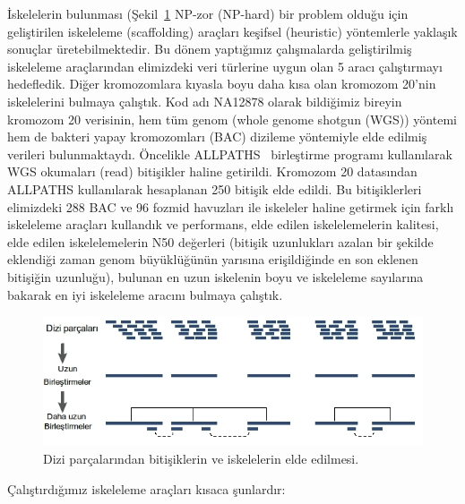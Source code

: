 \documentclass[11pt]{article}
\begin{document}
İskelelerin bulunması (Şekil~\ref{fig:scaffold} NP-zor (NP-hard) bir problem olduğu için geliştirilen iskeleleme (scaffolding) araçları keşifsel (heuristic) yöntemlerle yaklaşık sonuçlar üretebilmektedir. Bu dönem yaptığımız çalışmalarda geliştirilmiş iskeleleme araçlarından elimizdeki veri türlerine uygun olan 5 aracı çalıştırmayı hedefledik. Diğer kromozomlara kıyasla boyu daha kısa olan kromozom 20'nin iskelelerini bulmaya çalıştık. Kod adı NA12878 olarak bildiğimiz bireyin kromozom 20 verisinin, hem tüm genom (whole genome shotgun (WGS)) yöntemi hem de bakteri yapay kromozomları (BAC) dizileme yöntemiyle elde edilmiş verileri bulunmaktaydı. Öncelikle ALLPATHS~\cite{Gnerre2011} birleştirme programı kullanılarak WGS okumaları (read) bitişikler haline getirildi. Kromozom 20 datasından ALLPATHS kullanılarak hesaplanan 250 bitişik elde edildi. Bu bitişiklerleri elimizdeki 288 BAC ve 96 fozmid havuzları ile iskeleler haline getirmek için farklı iskeleleme araçları kullandık ve performans, elde edilen iskelelemelerin kalitesi, elde edilen iskelelemelerin N50 değerleri (bitişik uzunlukları azalan bir şekilde eklendiği zaman genom büyüklüğünün yarısına erişildiğinde en son eklenen bitişiğin uzunluğu), bulunan en uzun iskelenin boyu ve iskeleleme sayılarına bakarak en iyi iskeleleme aracını bulmaya çalıştık. 

\begin{figure}[htb]
\begin{center}
  \includegraphics[scale=0.75]{scaffold.png}
\end{center}
\caption{Dizi parçalarından bitişiklerin ve iskelelerin elde edilmesi.}
\label{fig:scaffold}
\end{figure}


Çalıştırdığımız iskeleleme araçları kısaca şunlardır:
\end{document}
